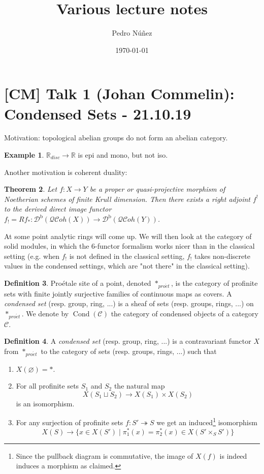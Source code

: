 \documentclass[11pt,A4]{article}
\title{Various lecture notes}
\author{Pedro Núñez}
\date{\today}
\theoremstyle{plain}
\newtheorem{thm}{Theorem}[section]
\theoremstyle{definition}
\newtheorem{defn}[thm]{Definition}
\newtheorem{exa}[thm]{Example}
\theoremstyle{remark}
\newcommand{\1}{\mathbbm{1}}
\newcommand{\C}{\mathscr{C}}
\newcommand{\Db}{\mathscr{D}^{\mathrm{b}}}
\newcommand{\QCoh}{\mathscr{QC}oh}
\DeclareMathOperator{\Cond}{Cond}
\newcommand{\pe}{*_{pro\acute et}}
\newcommand{\fp}[1]{\times_{#1}}
\begin{document}
\maketitle

\tableofcontents

\section{[CM] Talk 1 (Johan Commelin): Condensed Sets - 21.10.19}

Motivation: topological abelian groups do not form an abelian category.

\begin{exa}
    $\mathbb{R}_{disc}\to \mathbb{R}$ is epi and mono, but not iso.
\end{exa}

Another motivation is coherent duality:

\begin{thm}
    Let $f\colon X\to Y$ be a proper or quasi-projective morphism of Noetherian schemes of finite Krull dimension. Then there exists a right adjoint $f^{!}$ to the derived direct image functor $f_{!}=Rf_{*}\colon \Db(\QCoh(X))\to \Db(\QCoh(Y))$.
\end{thm}

At some point analytic rings will come up.
We will then look at the category of solid modules, in which the 6-functor formalism works nicer than in the classical setting (e.g. when $f_{!}$ is not defined in the classical setting, $f_{!}$ takes non-discrete values in the condensed settings, which are "not there" in the classical setting).

\begin{defn}
    Pro\'{e}tale site of a point, denoted $\pe$, is the category of profinite sets with finite jointly surjective families of continuous maps as covers.
    A \textit{condensed set} (resp. group, ring, ...) is a sheaf of sets (resp. groups, rings, ...) on $\pe$.
    We denote by $\Cond(\C)$ the category of condensed objects of a category $\C$.
\end{defn}

\begin{defn}
    A \textit{condensed set} (resp. group, ring, ...) is a contravariant functor $X$ from $\pe$ to the category of sets (resp. groups, rings, ...) such that 
    \begin{enumerate}[label=\roman*)]
	\item $X(\varnothing)=*$.
	\item For all profinite sets $S_{1}$ and $S_{2}$ the natural map
	    \[ X(S_{1}\sqcup S_{2})\to X(S_{1})\times X(S_{2}) \]
	    is an isomorphism.
	\item For any surjection of profinite sets $f\colon S'\twoheadrightarrow S$ we get an induced\footnote{Since the pullback diagram is commutative, the image of $X(f)$ is indeed induces a morphism as claimed.} isomorphism
	    \[ X(S)\to \{ x\in X(S')\mid \pi_{1}^{*}(x)=\pi_{2}^{*}(x)\in X(S'\fp{S}S')\} \]
    \end{enumerate}
\end{defn}
\end{document}
